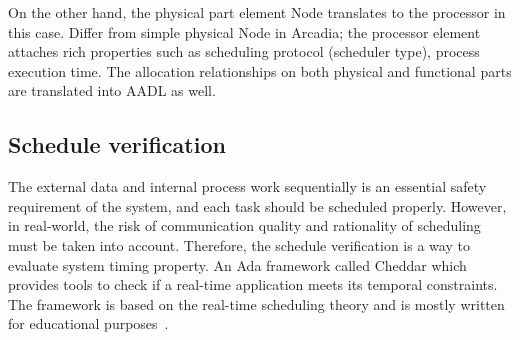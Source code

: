 On the other hand, the physical part element Node translates to the processor in this case. Differ from simple physical Node in Arcadia; the processor element attaches rich properties such as scheduling protocol (scheduler type), process execution time. 
The allocation relationships on both physical and functional parts are translated into AADL as well.
\subsection{Schedule verification}
The external data and internal process work sequentially is an essential safety requirement of the system, and each task should be scheduled properly. However, in real-world, the risk of communication quality and rationality of scheduling must be taken into account. Therefore, the schedule verification is a way to evaluate system timing property. An Ada framework called Cheddar which provides tools to check if a real-time application meets its temporal constraints. The framework is based on the real-time scheduling theory and is mostly written for educational purposes~\cite{Singhoff:2005:SMR:1103846.1103847}.



